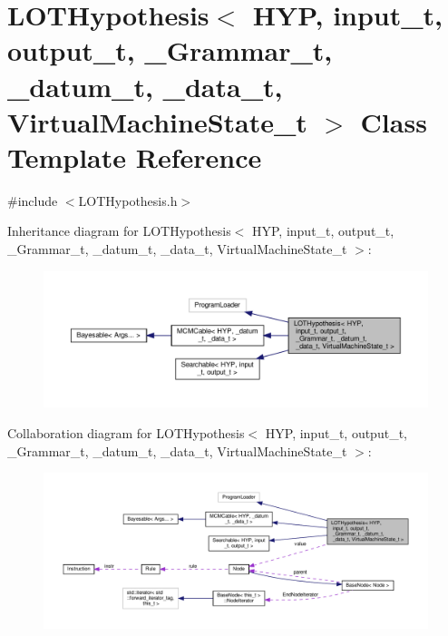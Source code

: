 \hypertarget{class_l_o_t_hypothesis}{}\section{L\+O\+T\+Hypothesis$<$ H\+YP, input\+\_\+t, output\+\_\+t, \+\_\+\+Grammar\+\_\+t, \+\_\+datum\+\_\+t, \+\_\+data\+\_\+t, Virtual\+Machine\+State\+\_\+t $>$ Class Template Reference}
\label{class_l_o_t_hypothesis}


{\ttfamily \#include $<$L\+O\+T\+Hypothesis.\+h$>$}



Inheritance diagram for L\+O\+T\+Hypothesis$<$ H\+YP, input\+\_\+t, output\+\_\+t, \+\_\+\+Grammar\+\_\+t, \+\_\+datum\+\_\+t, \+\_\+data\+\_\+t, Virtual\+Machine\+State\+\_\+t $>$\+:\nopagebreak
\begin{figure}[H]
\begin{center}
\leavevmode
\includegraphics[width=350pt]{class_l_o_t_hypothesis__inherit__graph}
\end{center}
\end{figure}


Collaboration diagram for L\+O\+T\+Hypothesis$<$ H\+YP, input\+\_\+t, output\+\_\+t, \+\_\+\+Grammar\+\_\+t, \+\_\+datum\+\_\+t, \+\_\+data\+\_\+t, Virtual\+Machine\+State\+\_\+t $>$\+:
\nopagebreak
\begin{figure}[H]
\begin{center}
\leavevmode
\includegraphics[width=350pt]{class_l_o_t_hypothesis__coll__graph}
\end{center}
\end{figure}

